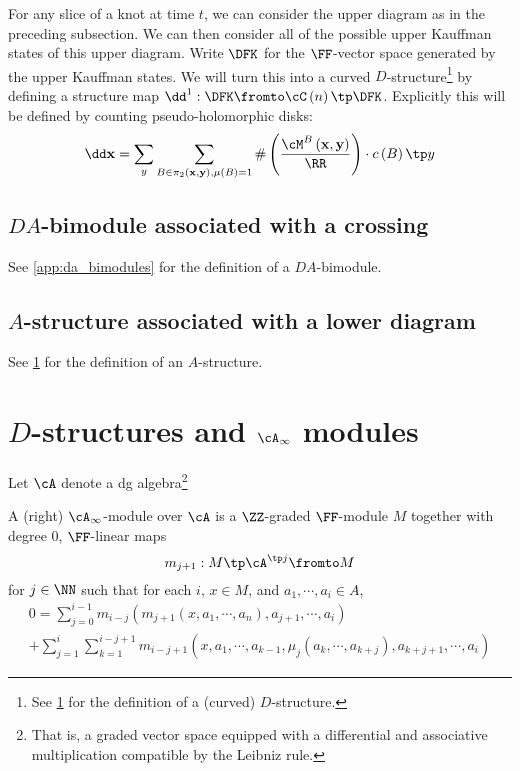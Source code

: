 \documentclass{amsproc}
\begin{document}
For any slice of a knot at time $t$, we can consider the upper diagram as in the preceding subsection.
We can then consider all of the possible upper Kauffman states of this upper diagram.
Write $\DFK$ for the $\FF$-vector space generated by the upper Kauffman states.
We will turn this into a curved $D$-structure\footnote{See \cref{app:d_structures} 
for the definition of a (curved) $D$-structure.}
by defining a structure map $\dd^1: \DFK \fromto \cC\left( n \right) \tp \DFK$.
Explicitly this will be defined by counting pseudo-holomorphic disks:
\begin{equation}
\dd \mathbf{x} = \sum_y\sum_{B\in \pi_2\left( \mathbf{x} , \mathbf{y} \right),\mu\left( B \right) = 1}
\#\left(\frac{\cM^B\left( \mathbf{x} , \mathbf{y} \right) }{\RR}\right)\cdot c\left( B \right) \tp y
\end{equation}

\subsection{$DA$-bimodule associated with a crossing}

See \cref{app:da_bimodules} for the definition of a $DA$-bimodule.

\subsection{$A$-structure associated with a lower diagram}

See \cref{app:d_structures} for the definition of an $A$-structure.

\appendix
\section{$D$-structures and $\cA_\infty$ modules}
\label{app:d_structures}

Let $\cA$ denote a dg algebra\footnote{
That is, a graded vector space equipped with a differential and associative multiplication
compatible by the Leibniz rule.}

A (right) $\cA_\infty$-module over $\cA$ is a $\ZZ$-graded
$\FF$-module $M$ together with degree $0$, $\FF$-linear maps
\begin{equation}
m_{j + 1}: M\tp \cA^{\tp j} \fromto M
\end{equation}
for $j\in \NN$ such that for each $i$, $x\in M$, and 
$a_1 , \cdots , a_i\in A$, 
\begin{multline}
0 = \sum_{j = 0}^{i-1}
m_{i - j} \left( m_{ j+1}\left( x , a_1 , \cdots , a_n \right) , 
a_{j + 1} , \cdots , a_i \right) \\
+ \sum_{j = 1}^i \sum_{k = 1}^{i - j + 1} m_{i - j + 1}
\left( x , a_1 , \cdots , a_{k-1} , \mu_j\left( a_k , \cdots , a_{k+j} \right),
a_{k + j + 1} , \cdots , a_i\right)
\end{multline}
\end{document}
